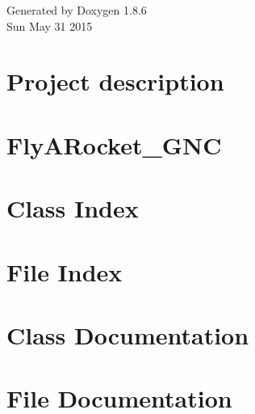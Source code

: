 \documentclass[twoside]{book}
\newcommand{\clearemptydoublepage}{%
  \newpage{\pagestyle{empty}\cleardoublepage}%
}
\begin{document}
\begin{titlepage}
\begin{center}
\vfill

{\large Generated by Doxygen 1.8.6}\\
\vspace*{0.5cm}
{\small Sun May 31 2015}\\

\end{center}



\end{titlepage}
\clearemptydoublepage
\tableofcontents
\clearemptydoublepage
{}
\hypersetup{pageanchor=true}

\chapter{Project description}
\label{index}\hypertarget{index}{}
\chapter{Fly\-A\-Rocket\-\_\-\-G\-N\-C}
\label{md_README}
\hypertarget{md_README}{}

\chapter{Class Index}

\chapter{File Index}

\chapter{Class Documentation}




\chapter{File Documentation}




















\newpage
{}
{}
\printindex
\end{document}
